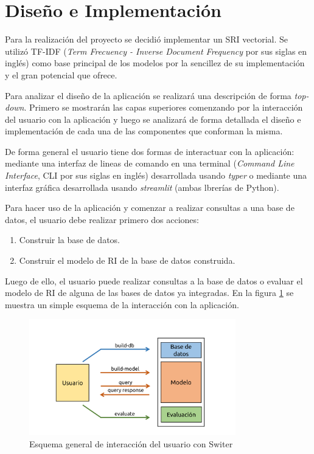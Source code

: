 \section{Diseño e Implementación}\label{sec:design}

Para la realización del proyecto se decidió implementar un SRI vectorial. Se
utilizó TF-IDF (\emph{Term Frecuency - Inverse Document Frequency} por sus
siglas en inglés) como base principal de los modelos por la sencillez de su
implementación y el gran potencial que ofrece.

Para analizar el diseño de la aplicación se realizará una descripción de forma
\emph{top-down}. Primero se mostrarán las capas superiores comenzando por la
interacción del usuario con la aplicación y luego se analizará de forma
detallada el diseño e implementación de cada una de las componentes que
conforman la misma.

De forma general el usuario tiene dos formas de interactuar con la aplicación:
mediante una interfaz de lineas de comando en una terminal (\emph{Command Line
Interface}, CLI por sus siglas en inglés) desarrollada usando \emph{typer} o
mediante una interfaz gráfica desarrollada usando \emph{streamlit} (ambas
lbrerías de Python).

Para hacer uso de la aplicación y comenzar a realizar consultas a una base de
datos, el usuario debe realizar primero dos acciones:

\begin{enumerate}
	\item Construir la base de datos.
	\item Construir el modelo de RI de la base de datos construida.
\end{enumerate}

Luego de ello, el usuario puede realizar consultas a la base de datos o
evaluar el modelo de RI de alguna de las bases de datos ya integradas. En
la figura \ref{fig:interaction} se muestra un simple esquema de la
interacción con la aplicación.

\begin{figure}[htb]%
	\begin{center}
		\includegraphics[width=0.8\textwidth]{./sri_01.png}
	\end{center}
	\caption{Esquema general de interacción del usuario con Switer}
	\label{fig:interaction}
\end{figure}

